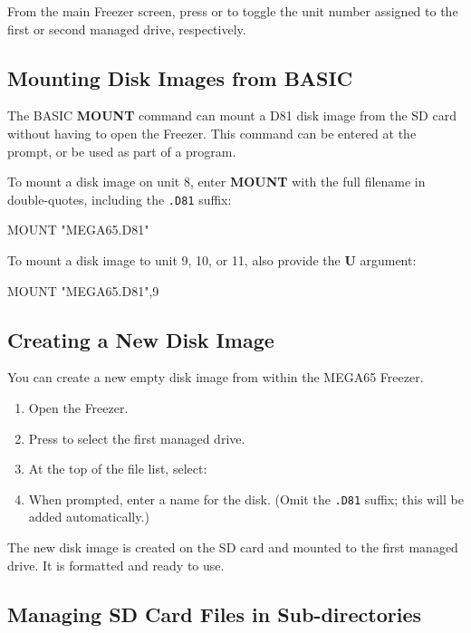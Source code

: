 From the main Freezer screen, press  or  to toggle the unit number assigned to the first or second managed drive, respectively.

\subsection{Mounting Disk Images from BASIC}

The BASIC {\bf MOUNT} command can mount a D81 disk image from the SD card without having to open the Freezer. This command can be entered at the  prompt, or be used as part of a program.

To mount a disk image on unit 8, enter {\bf MOUNT} with the full filename in double-quotes, including the {\tt .D81} suffix:

\begin{screencode}
MOUNT "MEGA65.D81"
\end{screencode}

To mount a disk image to unit 9, 10, or 11, also provide the {\bf U} argument:

\begin{screencode}
MOUNT "MEGA65.D81",9
\end{screencode}

\subsection{Creating a New Disk Image}

You can create a new empty disk image from within the MEGA65 Freezer.

\begin{enumerate}
\item Open the Freezer.
\item Press  to select the first managed drive.
\item At the top of the file list, select: 
\item When prompted, enter a name for the disk. (Omit the {\tt .D81} suffix; this will be added automatically.)
\end{enumerate}

The new disk image is created on the SD card and mounted to the first managed drive. It is formatted and ready to use.

\subsection{Managing SD Card Files in Sub-directories}

